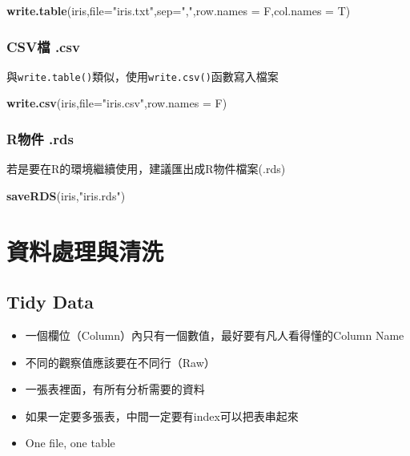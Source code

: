 \documentclass[]{book}
\newenvironment{Shaded}{\begin{snugshade}}{\end{snugshade}}
\newcommand{\KeywordTok}[1]{\textcolor[rgb]{0.13,0.29,0.53}{\textbf{{#1}}}}
\newcommand{\DataTypeTok}[1]{\textcolor[rgb]{0.13,0.29,0.53}{{#1}}}
\newcommand{\StringTok}[1]{\textcolor[rgb]{0.31,0.60,0.02}{{#1}}}
\newcommand{\NormalTok}[1]{{#1}}
\providecommand{\tightlist}{%
  \setlength{\itemsep}{0pt}\setlength{\parskip}{0pt}}
\theoremstyle{definition}
\theoremstyle{definition}
\theoremstyle{remark}
\begin{document}
\begin{Shaded}
\begin{Highlighting}[]
\KeywordTok{write.table}\NormalTok{(iris,}\DataTypeTok{file=}\StringTok{"iris.txt"}\NormalTok{,}\DataTypeTok{sep=}\StringTok{","}\NormalTok{,}\DataTypeTok{row.names =} \NormalTok{F,}\DataTypeTok{col.names =} \NormalTok{T)}
\end{Highlighting}
\end{Shaded}

\subsection{CSV檔 .csv}\label{csv-.csv}

與\texttt{write.table()}類似，使用\texttt{write.csv()}函數寫入檔案

\begin{Shaded}
\begin{Highlighting}[]
\KeywordTok{write.csv}\NormalTok{(iris,}\DataTypeTok{file=}\StringTok{"iris.csv"}\NormalTok{,}\DataTypeTok{row.names =} \NormalTok{F)}
\end{Highlighting}
\end{Shaded}

\subsection{R物件 .rds}\label{r-.rds-1}

若是要在R的環境繼續使用，建議匯出成R物件檔案(.rds)

\begin{Shaded}
\begin{Highlighting}[]
\KeywordTok{saveRDS}\NormalTok{(iris,}\StringTok{"iris.rds"}\NormalTok{)}
\end{Highlighting}
\end{Shaded}

\chapter{資料處理與清洗}\label{manipulation}

\section{Tidy Data}\label{tidy-data}

\begin{itemize}
\tightlist
\item
  一個欄位（Column）內只有一個數值，最好要有凡人看得懂的Column Name
\item
  不同的觀察值應該要在不同行（Raw）
\item
  一張表裡面，有所有分析需要的資料
\item
  如果一定要多張表，中間一定要有index可以把表串起來
\item
  One file, one table
\end{itemize}
\end{document}
